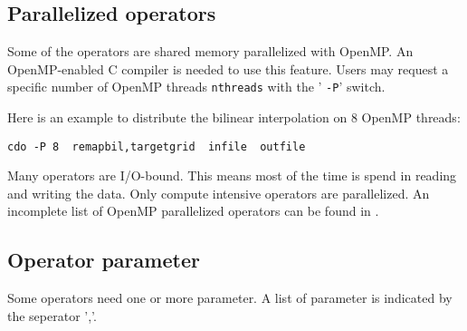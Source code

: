 \subsection{Parallelized operators}

Some of the {\CDO} operators are shared memory parallelized with OpenMP.
An OpenMP-enabled C compiler is needed to use this feature.
Users may request a specific number of OpenMP threads \texttt{nthreads} with the ' \texttt{-P}' switch.

Here is an example to distribute the bilinear interpolation on 8 OpenMP threads:
\begin{lstlisting}[frame=single, backgroundcolor=\color{pcolor2}, basicstyle=\ttfamily, columns=flexible]
   cdo -P 8  remapbil,targetgrid  infile  outfile
\end{lstlisting}

Many {\CDO} operators are I/O-bound. This means most of the time is spend in reading and writing the data. 
Only compute intensive {\CDO} operators are parallelized. 
An incomplete list of OpenMP parallelized operators can be found in .

\subsection{Operator parameter}

Some operators need one or more parameter. A list of parameter is indicated by the seperator ','.

